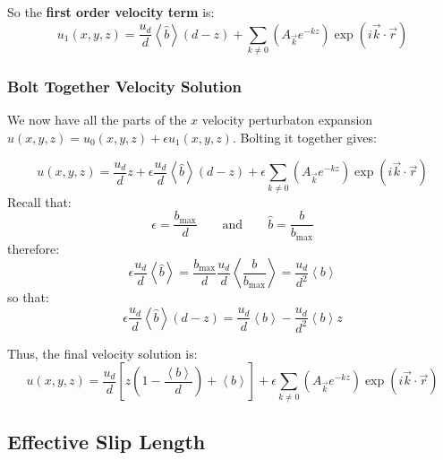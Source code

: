\documentclass[12pt, a4paper, twoside, openright]{book}
\newcommand{\bmax}{\ensuremath{b_{\mathrm{max}}}}
\begin{document}
\vspace{1em}
So the \textbf{first order velocity term} is:
\begin{equation}
u_1(x,y,z) =  \frac{u_d}{d} \left< \hat{b} \right> (d - z)
 + \sum_{k \neq 0} 
\left(  A_{\vec{k}} e^{-kz} \right)
\exp(i \vec{k}\cdot \vec{r})
\end{equation}

\subsubsection*{Bolt Together Velocity Solution}
We now have all the parts of the $x$ velocity perturbaton expansion $u(x,y,z) = u_0(x,y,z) + \epsilon u_1(x,y,z)$.  Bolting it together gives:

\begin{equation}
u(x,y,z) = \frac{u_d}{d} z
 + \epsilon \frac{u_d}{d} \left< \hat{b} \right> (d - z)
 +  \epsilon \sum_{k \neq 0} 
\left(  A_{\vec{k}} e^{-kz} \right)
\exp(i \vec{k}\cdot \vec{r})
\end{equation}
Recall that:
\begin{equation}
\epsilon = \frac{\bmax}{d} \qquad \text{and} \qquad
\hat{b} = \frac{b}{\bmax}
\end{equation}
therefore:
\begin{equation}
\epsilon \frac{u_d}{d} \left< \hat{b} \right> 
= \frac{\bmax}{d} \frac{u_d}{d} \left< \frac{b}{\bmax} \right> 
= \frac{u_d}{d^2} \left< b \right>
\end{equation}
so that:
\begin{equation}
\epsilon \frac{u_d}{d} \left< \hat{b} \right> (d - z)
= \frac{u_d}{d} \left< b \right> - \frac{u_d}{d^2} \left< b \right> z
\end{equation}


Thus, the final velocity solution is:
\begin{equation}
u(x,y,z) = \frac{u_d}{d} 
\left[ z \left( 1 - \frac{\left< b \right>}{d} \right) + \left< b \right> \right]
 +  \epsilon \sum_{k \neq 0} 
\left(  A_{\vec{k}} e^{-kz} \right)
\exp(i \vec{k}\cdot \vec{r})
\end{equation}



\subsection*{Effective Slip Length}
\end{document}
